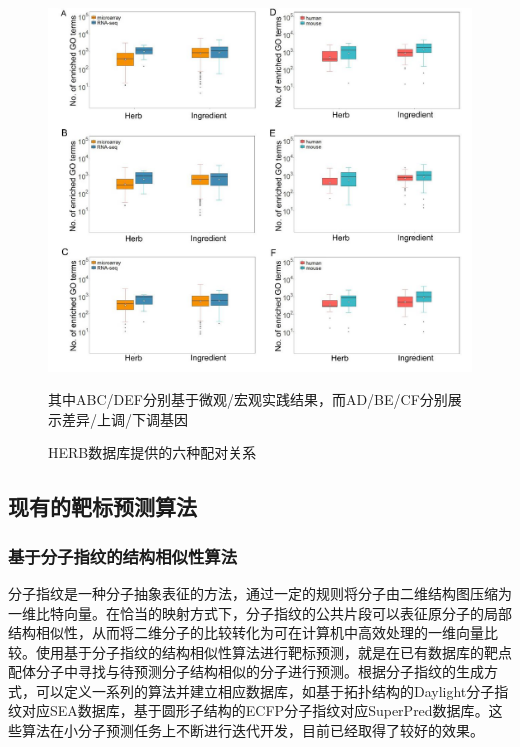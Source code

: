 \begin{figure}[H]
  \centering
  \includegraphics[width=\linewidth]{figures/HERB.png}
  \caption{HERB数据库提供的六种配对关系\cite{Fang_Dong_Liu_Guo_Zhao_Zhang_Bu_Liu_Huo_Cao_et_al._2021}}
  其中ABC/DEF分别基于微观/宏观实践结果，而AD/BE/CF分别展示差异/上调/下调基因
  \label{fig:HERB}
\end{figure}

\subsection{现有的靶标预测算法}

\subsubsection{基于分子指纹的结构相似性算法}

分子指纹是一种分子抽象表征的方法，通过一定的规则将分子由二维结构图压缩为一维比特向量。在恰当的映射方式下，分子指纹的公共片段可以表征原分子的局部结构相似性，从而将二维分子的比较转化为可在计算机中高效处理的一维向量比较。使用基于分子指纹的结构相似性算法进行靶标预测，就是在已有数据库的靶点配体分子中寻找与待预测分子结构相似的分子进行预测。根据分子指纹的生成方式，可以定义一系列的算法并建立相应数据库，如基于拓扑结构的Daylight分子指纹对应SEA数据库\cite{Keiser_Roth_Armbruster_Ernsberger_Irwin_Shoichet_2007}，基于圆形子结构的ECFP分子指纹对应SuperPred数据库\cite{Nickel_Gohlke_Erehman_Banerjee_Rong_Goede_Dunkel_Preissner_2014}。这些算法在小分子预测任务上不断进行迭代开发，目前已经取得了较好的效果。

